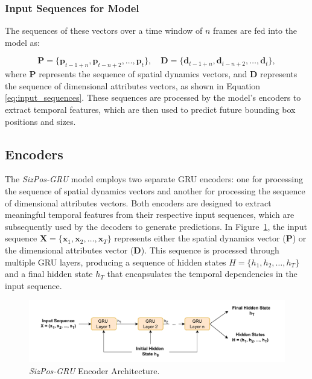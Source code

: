 \documentclass[12pt,oneside]{book} %
\begin{document}
\subsubsection*{Input Sequences for Model}
\noindent The sequences of these vectors over a time window of \(n\) frames are fed into the model as:

\[
    \mathbf{P} = \{\mathbf{p}_{t-1+n}, \mathbf{p}_{t-n+2}, \dots, \mathbf{p}_t\}, \quad \mathbf{D} = \{\mathbf{d}_{t-1+n}, \mathbf{d}_{t-n+2}, \dots, \mathbf{d}_t\}, \label{eq:input_sequences}
\]
where $\mathbf{P}$ represents the sequence of spatial dynamics vectors, and
$\mathbf{D}$ represents the sequence of dimensional attributes vectors, as
shown in Equation \eqref{eq:input_sequences}. These sequences are processed by
the model's encoders to extract temporal features, which are then used to
predict future bounding box positions and sizes.

\subsection{Encoders}
\noindent The \textit{SizPos-GRU} model employs two separate GRU encoders: one for processing the sequence of spatial dynamics vectors and another for processing the sequence of dimensional attributes vectors. Both encoders are designed to extract meaningful temporal features from their respective input sequences, which are subsequently used by the decoders to generate predictions. In Figure~\ref{fig:sizpos-gru-encoder}, the input sequence \( \mathbf{X} = \{\mathbf{x}_1, \mathbf{x}_2, \dots, \mathbf{x}_T\} \) represents either the spatial dynamics vector (\(\mathbf{P}\)) or the dimensional attributes vector (\(\mathbf{D}\)). This sequence is processed through multiple GRU layers, producing a sequence of hidden states \( H = \{h_1, h_2, \dots, h_T\} \) and a final hidden state \( h_T \) that encapsulates the temporal dependencies in the input sequence.

\begin{figure}[H]
    \centering
    \includegraphics[width=1\textwidth]{figures/GRUSizPosEncoder.drawio.pdf}
    \caption{\textit{SizPos-GRU} Encoder Architecture.}
    \label{fig:sizpos-gru-encoder}
\end{figure}
\end{document}
